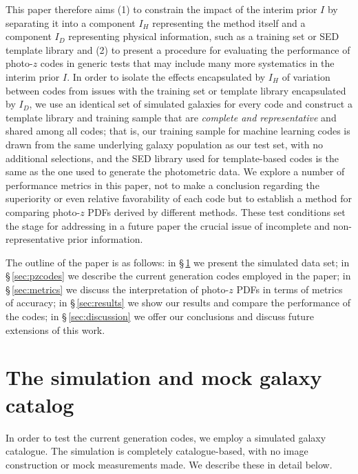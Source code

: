 \documentclass[usenatbib]{mn2e}
\begin{document}
This paper therefore aims (1) to constrain the impact of the interim prior $I$ by separating it into a component $I_{H}$ representing the method itself and a component $I_{D}$ representing physical information, such as a training set or SED template library and (2) to present a procedure for evaluating the performance of photo-$z$ codes in generic tests that may include many more systematics in the interim prior $I$.
In order to isolate the effects encapsulated by $I_{H}$ of variation between codes from issues with the training set or template library encapsulated by $I_{D}$, we use an identical set of simulated galaxies for every code and construct a template library and training sample that are {\it complete and representative} and shared among all codes; that is, our training sample for machine learning codes is drawn from the same underlying galaxy population as our test set, with no additional selections, and the SED library used for template-based codes is the same as the one used to generate the photometric data.  
We explore a number of performance metrics in this paper, not to make a conclusion regarding the superiority or even relative favorability of each code but to establish a method for comparing photo-$z$ PDFs derived by different methods.
These test conditions set the stage for addressing in a future paper the crucial issue of incomplete and non-representative prior information.

The outline of the paper is as follows: in \S\,\ref{sec:sims} we present the simulated data set; in \S\,\ref{sec:pzcodes} we describe the current generation codes employed in the paper;  in \S\,\ref{sec:metrics} we discuss the interpretation of photo-$z$ PDFs in terms of metrics of accuracy; in \S\,\ref{sec:results} we show our results and compare the performance of the codes; in \S\,\ref{sec:discussion} we offer our conclusions and discuss future extensions of this work.


\section{The simulation and mock galaxy catalog}
\label{sec:sims}

In order to test the current generation codes, we employ a simulated galaxy catalogue. The simulation is completely catalogue-based, with no image construction or mock measurements made. We describe these in detail below.  
\end{document}
